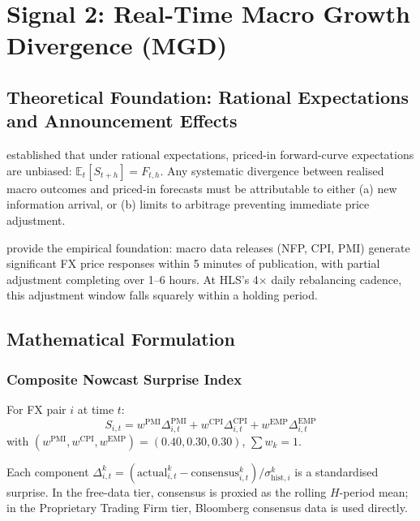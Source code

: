 \documentclass[12pt,a4paper]{article}
\begin{document}
\section{Signal 2: Real-Time Macro Growth Divergence (MGD)}
\label{sec:mgd}

\subsection{Theoretical Foundation: Rational Expectations and Announcement Effects}

\citet{muth1961} established that under rational expectations, priced-in forward-curve expectations are unbiased: $\mathbb{E}_t[S_{t+h}] = F_{t,h}$. Any systematic divergence between realised macro outcomes and priced-in forecasts must be attributable to either (a) new information arrival, or (b) limits to arbitrage preventing immediate price adjustment.

\citet{andersen2003} provide the empirical foundation: macro data releases (NFP, CPI, PMI) generate significant FX price responses within 5 minutes of publication, with partial adjustment completing over 1--6 hours. At HLS's 4$\times$ daily rebalancing cadence, this adjustment window falls squarely within a holding period.

\subsection{Mathematical Formulation}

\subsubsection{Composite Nowcast Surprise Index}

For FX pair $i$ at time $t$:
\begin{equation}
  S_{i,t} = w^{\text{PMI}}\Delta_{i,t}^{\text{PMI}} + w^{\text{CPI}}\Delta_{i,t}^{\text{CPI}} + w^{\text{EMP}}\Delta_{i,t}^{\text{EMP}}
  \label{eq:composite}
\end{equation}
with $(w^{\text{PMI}}, w^{\text{CPI}}, w^{\text{EMP}}) = (0.40, 0.30, 0.30)$, $\sum w_k = 1$.

Each component $\Delta_{i,t}^k = (\text{actual}_{i,t}^k - \text{consensus}_{i,t}^k)/\sigma_{\text{hist},i}^k$ is a standardised surprise. In the free-data tier, consensus is proxied as the rolling $H$-period mean; in the Proprietary Trading Firm tier, Bloomberg consensus data is used directly.
\end{document}
